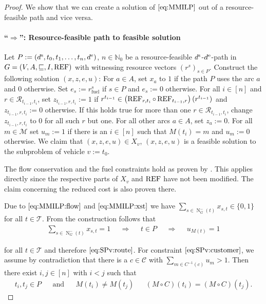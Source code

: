 \begin{proof}

We show that we can create a solution of $\eqref{eq:MMILP}$ out of a resource-feasible path and vice versa.

\paragraph{\enquote{$\boldsymbol{\Rightarrow}$}: Resource-feasible path to feasible solution} \proofparfill

Let ${P:=\left(d^{\operatorname{s}},t_0,t_1,\dots,t_n,d^{\operatorname{e}}\right)}$, ${n\in\mathbb{N}_0}$ be a resource-feasible $d^{\operatorname{s}}$-$d^{\operatorname{e}}$-path in\linebreak
${G=\left(V,A,\sqsubseteq,I,\operatorname{REF}\right)}$ with witnessing resource vectors $\left(r^s\right)_{s\in P}$. Construct the following solution $(x,z,e,u)$: For $a\in A$, set $x_a$ to $1$ if the path $P$ uses the arc $a$ and $0$ otherwise. Set ${e_s := r^s_{\operatorname{fuel}}}$ if $s\in P$ and $e_s:=0$ otherwise. For all $i\in[n]$ and $r\in\mathcal{R}_{t_{i-1},t_i}$, set ${z_{t_{i-1},r,t_i} := 1}$ if ${r^{t_{i-1}}\in\left(\operatorname{REF}_{r,t_i}\circ\operatorname{REF}_{t_{i-1},r}\right)\left(r^{t_{i-1}}\right)}$ and ${z_{t_{i-1},r,t_i} := 0}$ otherwise. If this holds true for more than one ${r\in\mathcal{R}_{t_{i-1},t_i}}$, change $z_{t_{i-1},r,t_i}$ to $0$ for all such $r$ but one. For all other arcs $a\in A$, set $z_a:=0$. For all $m\in\mathcal{M}$ set ${u_m := 1}$ if there is an ${i\in[n]}$ such that ${M\left(t_i\right)=m}$ and ${u_m := 0}$ otherwise. We claim that $(x,z,e,u)\in X_v$, \ie $(x,z,e,u)$ is a feasible solution to the subproblem of vehicle $v:=t_0$.

The flow conservation and the fuel constraints hold as proven by \cite{Kaiser}. This applies directly since the respective parts of $X_v$ and $\operatorname{REF}$ have not been modified. The claim concerning the reduced cost is also proven there.

Due to $\eqref{eq:MMILP:flow}$ and $\eqref{eq:MMILP:xst}$ we have ${\sum_{s\in\operatorname{N}^-_{G}(t)} x_{s,t} \in\{0,1\}}$ for all $t\in\mathcal{T}$. From the construction follows that
\begin{align*}
	\sum_{s\in\operatorname{N}^-_{G}(t)} x_{s,t} = 1 && \Rightarrow && t\in P && \Rightarrow && u_{M(t)} = 1
\end{align*}

for all $t\in\mathcal{T}$ and therefore $\eqref{eq:SPv:route}$. For constraint $\eqref{eq:SPv:customer}$, we assume by contradiction that there is a $c\in\mathcal{C}$ with ${\sum_{m\in C^{-1}(c)} u_m > 1}$. Then there exist ${i,j\in[n]}$ with ${i<j}$ such that
\begin{align*}
	t_i,t_j\in P && \text{and} && M\left(t_i\right)\neq M\left(t_j\right) && (M\circ C)\left(t_i\right) = (M\circ C)\left(t_j\right).
\end{align*}


\end{proof}
